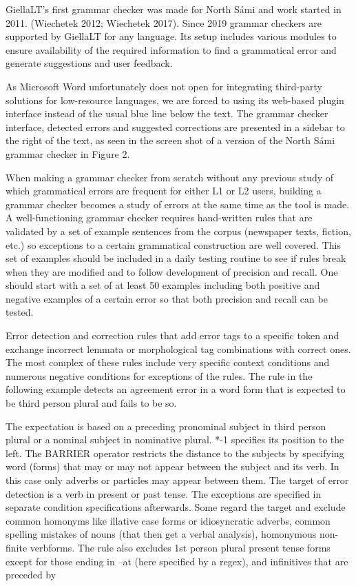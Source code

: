 \documentclass[free]{flammie}
\begin{document}
GiellaLT’s first grammar checker was made for North Sámi and work started in 2011.
(Wiechetek 2012; Wiechetek 2017). Since 2019 grammar checkers are supported by GiellaLT for any language. Its setup includes various modules to ensure availability of the required information to find a grammatical error and generate suggestions and user feedback.

As Microsoft Word unfortunately does not open for integrating third-party solutions for
low-resource languages, we are forced to using its web-based plugin interface instead of
the usual blue line below the text. The grammar checker interface, detected errors and suggested corrections are presented in a sidebar to the right of the text, as seen in the screen
shot of a version of the North Sámi grammar checker in Figure 2.

When making a grammar checker from scratch without any previous study of which
grammatical errors are frequent for either L1 or L2 users, building a grammar checker becomes a study of errors at the same time as the tool is made. A well-functioning grammar
checker requires hand-written rules that are validated by a set of example sentences from
the corpus (newspaper texts, fiction, etc.) so exceptions to a certain grammatical construction are well covered. This set of examples should be included in a daily testing routine to
see if rules break when they are modified and to follow development of precision and recall.
One should start with a set of at least 50 examples including both positive and negative
examples of a certain error so that both precision and recall can be tested.

Error detection and correction rules that add error tags to a specific token and exchange
incorrect lemmata or morphological tag combinations with correct ones. The most complex
of these rules include very specific context conditions and numerous negative conditions
for exceptions of the rules. The rule in the following example detects an agreement error in
a word form that is expected to be third person plural and fails to be so.

The expectation is based on a preceding pronominal subject in third person plural or a
nominal subject in nominative plural. *-1 specifies its position to the left. The BARRIER
operator restricts the distance to the subjects by specifying word (forms) that may or may
not appear between the subject and its verb. In this case only adverbs or particles may
appear between them. The target of error detection is a verb in present or past tense.
The exceptions are specified in separate condition specifications afterwards. Some regard the target and exclude common homonyms like illative case forms or idiosyncratic
adverbs, common spelling mistakes of nouns (that then get a verbal analysis), homonymous
non-finite verbforms. The rule also excludes 1st person plural present tense forms except
for those ending in –at (here specified by a regex), and infinitives that are preceded by
\end{document}
